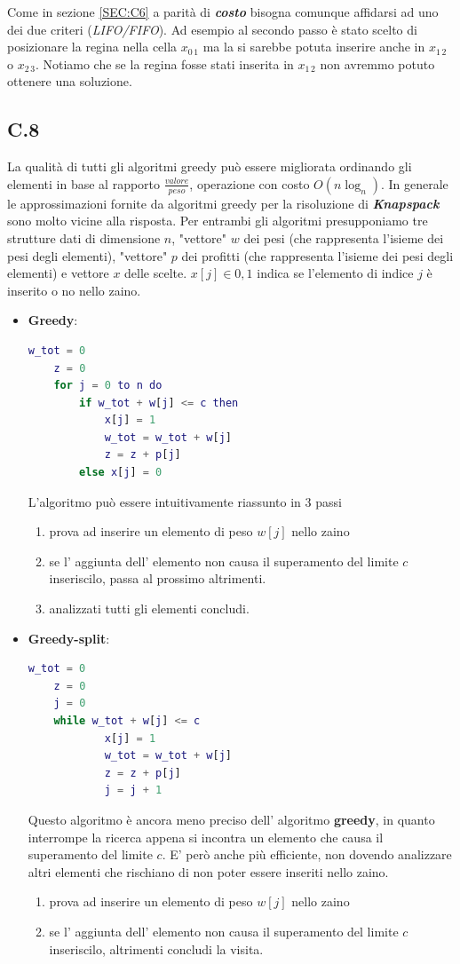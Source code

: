 \documentclass[a4paper]{article}
\newcommand{\imp}[1]{\textbf{\textit{#1}}}
\begin{document}
Come in sezione \ref{SEC:C6} a parità di \imp{costo} bisogna comunque affidarsi ad uno dei due criteri (\textit{LIFO/FIFO}).
Ad esempio al secondo passo è stato scelto di posizionare la regina nella cella $x_{0 \, 1}$ ma la si sarebbe potuta inserire anche in $x_{1 \, 2}$ o $x_{2 \, 3}$.
Notiamo che se la regina fosse stati inserita in $x_{1 \, 2}$ non avremmo potuto ottenere una soluzione. 
\subsection{C.8}
La qualità di tutti gli algoritmi greedy può essere migliorata ordinando gli elementi in base al rapporto $\frac{valore}{peso}$, operazione con costo $O(n\log_n)$.
In generale le approssimazioni fornite da algoritmi greedy per la risoluzione di \imp{Knapspack} sono molto vicine alla risposta. %
Per entrambi gli algoritmi presupponiamo tre strutture dati di dimensione $n$, "vettore" $w$ dei pesi (che rappresenta l'isieme dei pesi degli elementi), "vettore" $p$ dei profitti  (che rappresenta l'isieme dei pesi degli elementi) e vettore $x$ delle scelte. $x[j] \in {0,1}$ indica se l'elemento di indice $j$ è inserito o no nello zaino.
\begin{itemize}
	\item \textbf{Greedy}: 
		\begin{lstlisting}[language=Matlab]
	w_tot = 0
	z = 0
	for j = 0 to n do
		if w_tot + w[j] <= c then
			x[j] = 1
			w_tot = w_tot + w[j]
			z = z + p[j]
		else x[j] = 0
		\end{lstlisting}
		L'algoritmo può essere intuitivamente riassunto in 3 passi
		\begin{enumerate}
			\item prova ad inserire un elemento di peso $w[j]$ nello zaino
			\item se l' aggiunta dell' elemento non causa il superamento del limite $c$ inseriscilo, passa al prossimo altrimenti.
			\item analizzati tutti gli elementi concludi.
		\end{enumerate}
	\item \textbf{Greedy-split}:
		\begin{lstlisting}[language=Matlab]
	w_tot = 0
	z = 0
	j = 0
	while w_tot + w[j] <= c
			x[j] = 1
			w_tot = w_tot + w[j]
			z = z + p[j]
			j = j + 1
		\end{lstlisting}
		Questo algoritmo è ancora meno preciso dell' algoritmo \textbf{greedy}, in quanto interrompe la ricerca appena si incontra un elemento che causa il superamento del limite $c$.
		E' però anche più efficiente, non dovendo analizzare altri elementi che rischiano di non poter essere inseriti nello zaino.
		\begin{enumerate}
			\item prova ad inserire un elemento di peso $w[j]$ nello zaino
			\item se l' aggiunta dell' elemento non causa il superamento del limite $c$ inseriscilo, altrimenti concludi la visita.
		\end{enumerate}
\end{itemize}
\end{document}
